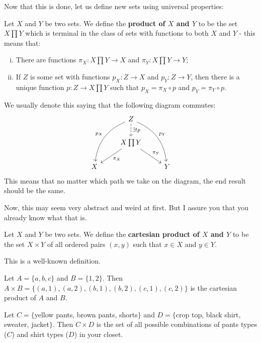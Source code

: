 Now that this is done, let us define new sets using universal properties:

\begin{df}
	Let $X$ and $Y$ be two sets. We define the \textbf{product of $X$ and $Y$} to be the set $X\prod Y$ which is terminal in the class of sets with functions to both $X$ and $Y$ - this means that:
	\begin{enumerate}[i.]
		\item There are functions $\pi_X:X\prod Y\to X$ and $\pi_Y:X\prod Y\to Y$;
		\item If $Z$ is some set with functions $p_X:Z\to X$ and $p_Y:Z\to Y$, then there is a unique function $p:Z\to X\prod Y$ such that $p_X=\pi_X\circ p$ and $p_Y=\pi_Y\circ p$.
	\end{enumerate}
\end{df}

We usually denote this saying that the following diagram commutes:
\[\begin{tikzcd}
& Z \arrow[ldd, "p_X"', bend right] \arrow[rdd, "p_Y", bend left] \arrow[d, "\exists!p", dashed] &   \\
& X\prod Y \arrow[ld, "\pi_X"] \arrow[rd, "\pi_Y"]                                               &   \\
X &                                                                                                & Y
\end{tikzcd}\]
This means that no matter which path we take on the diagram, the end result should be the same.

Now, this may seem very abstract and weird at first. But I assure you that you already know what that is.

\begin{df}
	Let $X$ and $Y$ be two sets. We define the \textbf{cartesian product of $X$ and $Y$} to be the set $X\times Y$ of all ordered pairs $(x,y)$ such that $x\in X$ and $y\in Y$.
\end{df}

This is a well-known definition.

\begin{ex}
	Let $A=\{a,b,c\}$ and $B=\{1,2\}$. Then $A\times B=\{(a,1),(a,2),(b,1),(b,2),(c,1),(c,2)\}$ is the cartesian product of $A$ and $B$.
	
	Let $C=\{$yellow pants, brown pants, shorts$\}$ and $D=\{$crop top, black shirt, sweater, jacket$\}$. Then $C\times D$ is the set of all possible combinations of pants types ($C$) and shirt types ($D$) in your closet.
\end{ex}

